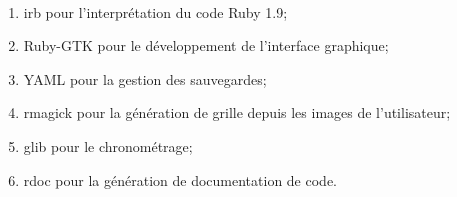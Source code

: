         \paragraph*{}
        \begin{enumerate}
                \item irb pour l'interprétation du code Ruby 1.9;
                \item Ruby-GTK pour le développement de l'interface graphique;
                \item YAML pour la gestion des sauvegardes; %
                \item rmagick pour la génération de grille depuis les images de l'utilisateur;
                \item glib pour le chronométrage;
                \item rdoc pour la génération de documentation de code.
        \end{enumerate}



